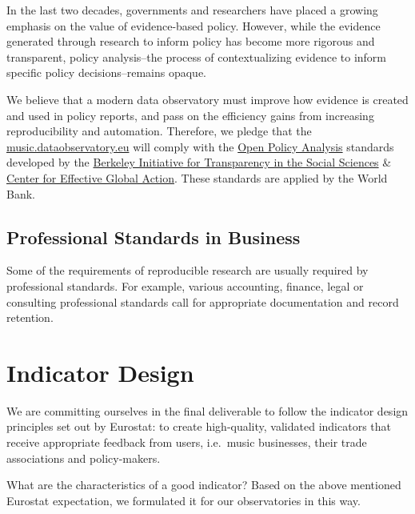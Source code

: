 \documentclass[
  a4paper,
  openany, a4paper, oneside]{book}
\begin{document}
In the last two decades, governments and researchers have placed a growing emphasis on the value of evidence-based policy. However, while the evidence generated through research to inform policy has become more rigorous and transparent, policy analysis--the process of contextualizing evidence to inform specific policy decisions--remains opaque.

We believe that a modern data observatory must improve how evidence is created and used in policy reports, and pass on the efficiency gains from increasing reproducibility and automation. Therefore, we pledge that the \href{https://music.dataobservatory.eu}{music.dataobservatory.eu} will comply with the \href{https://www.bitss.org/opa/}{Open Policy Analysis} standards developed by the \href{https://www.bitss.org/}{Berkeley Initiative for Transparency in the Social Sciences} \& \href{https://cega.berkeley.edu/}{Center for Effective Global Action}. These standards are applied by the World Bank.

\hypertarget{business-professional-standards}{%
\subsection{Professional Standards in Business}\label{business-professional-standards}}

Some of the requirements of reproducible research are usually required by professional standards. For example, various accounting, finance, legal or consulting professional standards call for appropriate documentation and record retention.

\hypertarget{indicator-design}{%
\section{Indicator Design}\label{indicator-design}}

We are committing ourselves in the final deliverable to follow the indicator design principles set out by Eurostat:
\citep{eurostat_harmonised_indicators_2014, kotzeva_harmonised_indicators_2017, eurostat_harmonised_indicators_2014} to create high-quality, validated indicators that receive appropriate feedback from users, i.e.~music businesses, their trade associations and policy-makers.

What are the characteristics of a good indicator? Based on the above mentioned Eurostat expectation, we formulated it for our observatories in this way.
\end{document}
